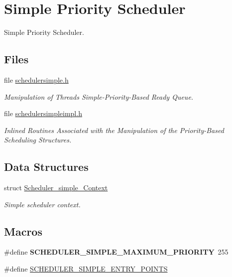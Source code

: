 \hypertarget{group__RTEMSScoreSchedulerSimple}{}\section{Simple Priority Scheduler}
\label{group__RTEMSScoreSchedulerSimple}


Simple Priority Scheduler.  


\subsection*{Files}
\begin{DoxyCompactItemize}
\item 
file \mbox{\hyperlink{schedulersimple_8h}{schedulersimple.\+h}}
\begin{DoxyCompactList}\small\item\em Manipulation of Threads Simple-\/\+Priority-\/\+Based Ready Queue. \end{DoxyCompactList}\item 
file \mbox{\hyperlink{schedulersimpleimpl_8h}{schedulersimpleimpl.\+h}}
\begin{DoxyCompactList}\small\item\em Inlined Routines Associated with the Manipulation of the Priority-\/\+Based Scheduling Structures. \end{DoxyCompactList}\end{DoxyCompactItemize}
\subsection*{Data Structures}
\begin{DoxyCompactItemize}
\item 
struct \mbox{\hyperlink{structScheduler__simple__Context}{Scheduler\+\_\+simple\+\_\+\+Context}}
\begin{DoxyCompactList}\small\item\em Simple scheduler context. \end{DoxyCompactList}\end{DoxyCompactItemize}
\subsection*{Macros}
\begin{DoxyCompactItemize}
\item 
\mbox{\label{group__RTEMSScoreSchedulerSimple_ga1ee5b422866a96de1bf3147501b24cfe}} 
\#define {\bfseries S\+C\+H\+E\+D\+U\+L\+E\+R\+\_\+\+S\+I\+M\+P\+L\+E\+\_\+\+M\+A\+X\+I\+M\+U\+M\+\_\+\+P\+R\+I\+O\+R\+I\+TY}~255
\item 
\#define \mbox{\hyperlink{group__RTEMSScoreSchedulerSimple_ga55d008c8f7c38285310037724627d923}{S\+C\+H\+E\+D\+U\+L\+E\+R\+\_\+\+S\+I\+M\+P\+L\+E\+\_\+\+E\+N\+T\+R\+Y\+\_\+\+P\+O\+I\+N\+TS}}
\end{DoxyCompactItemize}
